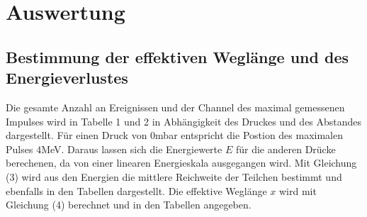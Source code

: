 \section{Auswertung}
\label{sec:Auswertung}
\subsection{Bestimmung der effektiven Weglänge und des Energieverlustes}
Die gesamte Anzahl an Ereignissen und der Channel des maximal gemessenen Impulses wird in Tabelle 1 und 2 in Abhängigkeit des Druckes und
des Abstandes dargestellt. Für einen Druck von $0$mbar entspricht die Postion des maximalen Pulses $4$MeV. Daraus lassen sich die Energiewerte $E$ für die
anderen Drücke berechenen, da von einer linearen Energieskala ausgegangen wird. Mit Gleichung (3) wird aus den Energien die mittlere Reichweite
der Teilchen bestimmt und ebenfalls in den Tabellen dargestellt. Die effektive Weglänge $x$ wird mit Gleichung (4) berechnet und in den Tabellen angegeben.



